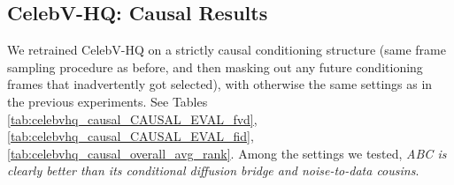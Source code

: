 \subsection{CelebV-HQ: Causal Results}\label{sec:celebv_hq_causal}

We retrained CelebV-HQ on a strictly causal conditioning structure (same frame sampling procedure as before, and then masking out any future conditioning frames that inadvertently got selected), with otherwise the same settings as in the previous experiments. See Tables \ref{tab:celebvhq_causal_CAUSAL_EVAL_fvd}, \ref{tab:celebvhq_causal_CAUSAL_EVAL_fid}, \ref{tab:celebvhq_causal_overall_avg_rank}. Among the settings we tested, \textit{ABC is clearly better than its conditional diffusion bridge and noise-to-data cousins}.


